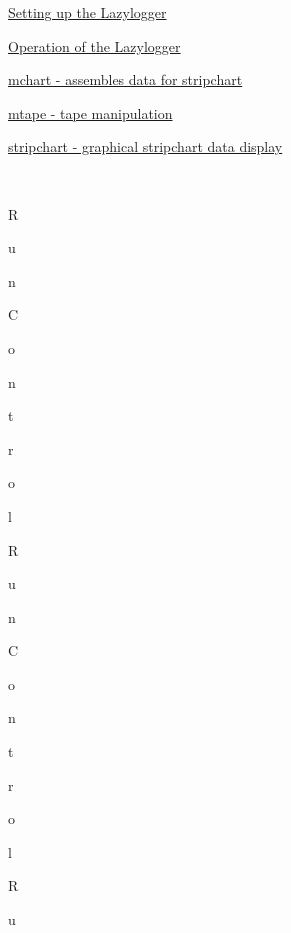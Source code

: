 \begin{TabularC}{2}
\begin{TabularC}{2}
\begin{DoxyItemize}
\begin{DoxyItemize}
\begin{DoxyItemize}
\begin{DoxyItemize}
\end{DoxyItemize}
\item \hyperlink{F_LogUtil_F_ODB_Lazy_setup}{Setting up the Lazylogger} 
\begin{DoxyItemize}
\item \hyperlink{F_LogUtil_F_ODB_Lazy_operation}{Operation of the Lazylogger} 
\end{DoxyItemize}
\item \hyperlink{F_LogUtil_F_mchart_utility}{mchart -\/ assembles data for stripchart} 
\item \hyperlink{F_LogUtil_F_mtape_utility}{mtape -\/ tape manipulation} 
\item \hyperlink{F_LogUtil_F_stripchartfile}{stripchart -\/ graphical stripchart data display} 
\end{DoxyItemize}
\end{DoxyItemize}
\end{DoxyItemize}\\
 \par
\par
\par
R\par
u\par
n\par
 \par
C\par
o\par
n\par
t\par
r\par
o\par
l\par
 \par
 \par
\par
\par
R\par
u\par
n\par
 \par
C\par
o\par
n\par
t\par
r\par
o\par
l\par
 \par
 \par
\par
\par
R\par
u\par

\end{TabularC}
\end{TabularC}
